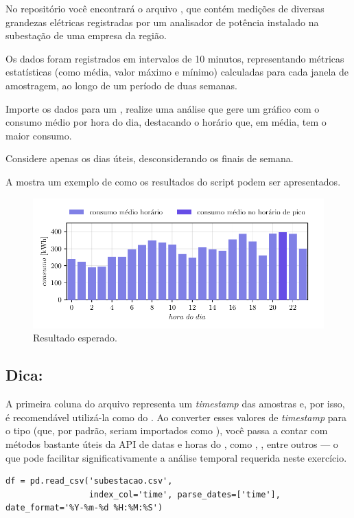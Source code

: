 No repositório  você encontrará o
arquivo , que contém medições de
diversas grandezas elétricas registradas por um analisador de potência instalado na subestação de uma empresa da região.

Os dados foram registrados em intervalos de 10 minutos, representando métricas estatísticas
(como média, valor máximo e mínimo) calculadas para cada janela de amostragem, ao longo de um período de duas semanas.

Importe os dados para um , realize uma análise que gere um gráfico com o consumo
médio por hora do dia, destacando o horário que, em média, tem o maior consumo.

Considere apenas os dias úteis, desconsiderando os finais de semana.

A  mostra um exemplo de como os resultados do script podem ser apresentados.
\begin{figure}[htbp]
    \centering
    \includegraphics[scale=1.0]{figs/subestacao}
    \caption{Resultado esperado.}
    \label{fig:subestacao}
\end{figure}

\subsection*{Dica:}
A primeira coluna do arquivo representa um \emph{timestamp} das amostras e, por isso, é recomendável utilizá-la
como  do .
Ao converter esses valores de \emph{timestamp} para o tipo  (que, por padrão, seriam importados
como ), você passa a contar com métodos
bastante úteis da API de datas e horas do , como , , entre outros ---
o que pode facilitar significativamente a análise temporal requerida neste exercício.
\begin{verbatim}
df = pd.read_csv('subestacao.csv',
                 index_col='time', parse_dates=['time'], date_format='%Y-%m-%d %H:%M:%S')
\end{verbatim}